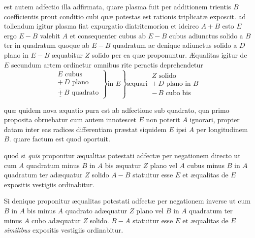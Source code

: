 \documentclass[11pt,a4paper]{article}
\begin{document}
est autem adfectio illa adfirmata, quare plasma fuit per additionem trientis $B$ coefficientis prout conditio cubi quæ  potestas est rationis triplicatæ exposcit. ad tollendum igitur plasma fiat expurgatio diatritemorion et idcirco $A + B$ esto $E$ ergo $E - B$ valebit $A$ et consequenter cubus ab $E - B$ cubus adiunctus solido a $B$ ter in \struck{\ill{}} quadratum quoque ab $E - B$ quadratum ac denique adiunctus solido a $D$ plano in $E - B$ æquabitur $Z$ solido per ea quæ proponuntur. Æqualitas igitur de $E$ secundum artem ordinetur omnibus rite peractis deprehendetur
\[ \left. \left. \begin{array}{l} E \text{ cubus} \\ +\,D \text{ plano} \\ \underline{\overline{+}}\,B \text{ quadrato} \end{array} \right\} \text{in } E \right\} \text{æquari} \ \begin{array}{l} Z \text{ solido} \\ \pm\,D \text{ plano in } B \\ -\,B \text{ cubo bis} \end{array} \]

quæ quidem nova æquatio pura est ab adfectione sub quadrato, qua primo proposita obruebatur cum autem innotescet $E$ non poterit $A$ ignorari, propter datam inter eas radices differentiam præstat siquidem $E$ ipsi $A$ per longitudinem $B$. quare factum est quod oportuit.

quod si \emph{quis} proponitur æqualitas potestati adfectæ per negationem directo ut cum $A$ quadratum minus $B$ in $A$ bis æquatur $Z$ plano vel $A$ cubus minus $B$ in $A$ quadratum ter adæquatur $Z$ solido $A - B$ statuitur esse $E$ et æqualitas de $E$ expositis vestigiis ordinabitur.

Si denique proponitur æqualitas potestati adfectæ per negationem inverse ut cum $B$ in $A$ bis minus $A$ quadrato adæquatur $Z$ plano vel $B$ in $A$ quadratum ter minus $A$ cubo adæquatur $Z$ solido. $B - A$ statuitur esse $E$ et æqualitas de $E$ \emph{similibus} expositis vestigiis ordinabitur.
\end{document}
